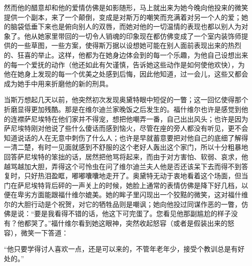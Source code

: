 \par 然而他的醋意却和他的爱情仿佛是如影随形，马上就出来为她今晚向他投来的微笑提供一个副本，来了一个颠倒，变成是对斯万的嘲笑而充满着对另一个人的爱；她的脑袋低垂下来也是俯向别人的双唇，而她对他的一切温情的表现也都以别人为对象了。他从她家里带回的一切令人销魂的印象现在都仿佛变成了一个室内装饰师提供的一些草图，一些方案，使得斯万据以设想她可能在别人面前表现出来的热烈的、狂喜的举止。这样，他都为在她身边体会到的每一个乐趣，为他自己设想出来的每一个爱抚的动作（他还如此有欠谨慎，告诉她这些动作是如何使他欢快），为他在她身上发现的每一个优美之处感到后悔，因此他知道，过一会儿，这些又都会成为她手中用来折磨他的新的刑具。
\par 当斯万想起几天以前，他突然初次发现奥黛特眼中短促的一瞥；这一回忆使得那个折磨显得更加残酷。那是在维尔迪兰家晚饭之后发生的。福什维尔也许是感觉到他的连襟萨尼埃特在他们家并不得宠，想把他嘲弄一番，自己出出风头；也许是因为萨尼埃特刚对他说了些什么傻话而感到恼火，尽管在座的旁人都没有听见，更不会知道说话的人在无意中刺伤了什么人；也许是早就蓄意要把对他自己的底细了解得一清二楚，有时一见面就感到不舒服的这个老好人轰出这个家门，所以十分粗暴地回答萨尼埃特的笨拙的话，居然把他骂将起来，而由于对方害怕、软弱、哀求，他越骂越加大胆，弄得这个可怜虫在问了维尔迪兰夫人他是否还该呆下去而得不到答复时，只好热泪盈眶，嘟嘟囔囔地走开了。奥黛特无动于衷地看着这个场面，但当门在萨尼埃特背后砰的一声关上的时候，她脸上通常的表情仿佛是降下好几档，以便在卑劣方面能跟福什维尔媲美。她的眸子里闪现出一个狡黠的微笑，这对福什维尔的大胆行动是个祝贺，对它的牺牲品则是嘲讽；她向他投过同谋作恶的一瞥，仿佛是说：“要是我看得不错的话，他这下可完蛋了。您看见他那副尴尬的样子没有？他都哭了。”福什维尔看到她这眼神，突然收起怒容（或者是假装出来的怒容），微笑一下答道：
\par “他只要学得讨人喜欢一点，还是可以来的，不管年老年少，接受个教训总是有好处的。”
